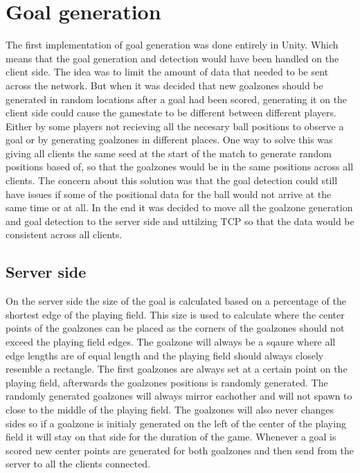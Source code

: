 \section{Goal generation}\label{subsec:goalrefactoring}
The first implementation of goal generation was done entirely in Unity.
Which means that the goal generation and detection would have been handled on the client side.
The idea was to limit the amount of data that needed to be sent across the network.
But when it was decided that new goalzones should be generated in random locations after a goal had been scored, generating it on the client side could cause the gamestate to be different between different players.
Either by some players not recieving all the necesary ball positions to observe a goal or by generating goalzones in different places.
One way to solve this was giving all clients the same seed at the start of the match to generate random positions based of, so that the goalzones would be in the same positions across all clients.
The concern about this solution was that the goal detection could still have issues if some of the positional data for the ball would not arrive at the same time or at all.
In the end it was decided to move all the goalzone generation and goal detection to the server side and uttilzing TCP so that the data would be consistent across all clients.

\subsection{Server side}
On the server side the size of the goal is calculated based on a percentage of the shortest edge of the playing field.
This size is used to calculate where the center points of the goalzones can be placed as the corners of the goalzones should not exceed the playing field edges.
The goalzone will always be a sqaure where all edge lengths are of equal length and the playing field should always closely resemble a rectangle.
The first goalzones are always set at a certain point on the playing field, afterwards the goalzones positions is randomly generated.
The randomly generated goalzones will always mirror eachother and will not spawn to close to the middle of the playing field.
The goalzones will also never changes sides so if a goalzone is initialy generated on the left of the center of the playing field it will stay on that side for the duration of the game.
Whenever a goal is scored new center points are generated for both goalzones and then send from the server to all the clients connected.

